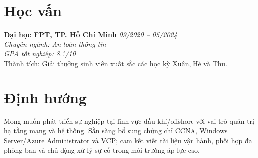 \documentclass[a4paper,10pt]{article}
\begin{document}
\vspace{10pt}
\section*{Học vấn}
\noindent \textbf{Đại học FPT, TP. Hồ Chí Minh} \hfill \textit{09/2020 -- 05/2024} \\
\textit{Chuyên ngành: An toàn thông tin} \\
\textit{GPA tốt nghiệp: 8.1/10} \\
Thành tích: Giải thưởng sinh viên xuất sắc các học kỳ Xuân, Hè và Thu.

\vspace{5pt}
\section*{Định hướng}
Mong muốn phát triển sự nghiệp tại lĩnh vực dầu khí/offshore với vai trò quản trị hạ tầng mạng và hệ thống. Sẵn sàng bổ sung chứng chỉ CCNA, Windows Server/Azure Administrator và VCP; cam kết viết tài liệu vận hành, phối hợp đa phòng ban và chủ động xử lý sự cố trong môi trường áp lực cao.
\end{document}
